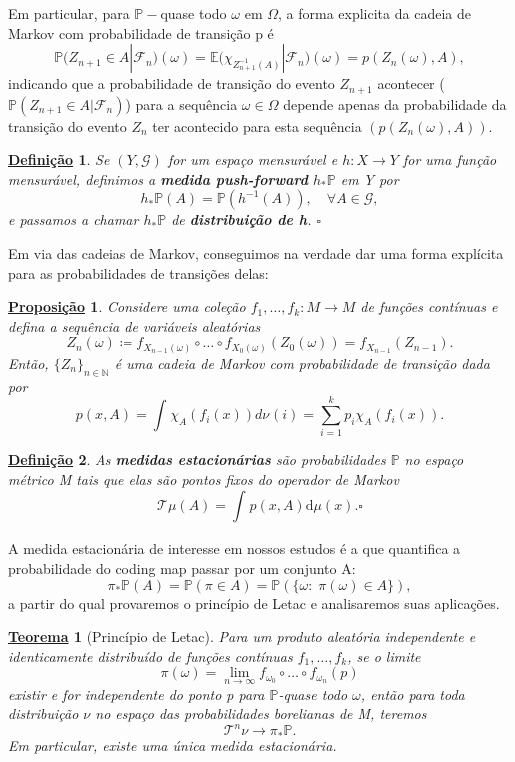 \documentclass[12pt]{article}
\newtheorem*{def*}{\underline{Definição}}
\newtheorem*{theorem*}{\underline{Teorema}}
\newtheorem*{prop*}{\underline{Proposição}}
\theoremstyle{definition}
\begin{document}
Em particular, para \(\mathbb{P}-\)quase todo \(\omega \) em \(\Omega \), a forma explicita da cadeia de Markov com probabilidade de transição p é
\[
	\mathbb{P}(Z_{n+1}\in A| \mathcal{F}_{n})(\omega  )= \mathbb{E}\bigl(\chi_{Z_{n+1}^{-1}(A)}| \mathcal{F}_{n}\bigr)(\omega ) = p(Z_{n}(\omega ), A),
\]
indicando que a probabilidade de transição do evento \(Z_{n+1}\) acontecer (\(\mathbb{P}(Z_{n+1}\in A| \mathcal{F}_{n})\)) para a sequência \(\omega \in \Omega \) depende apenas da probabilidade da transição do evento \(Z_{n}\) ter acontecido para esta sequência \((p(Z_{n}(\omega ), A))\).

\begin{def*}
	Se \((Y, \mathcal{G})\) for um espaço mensurável e \(h:X\rightarrow Y\) for uma função mensurável, definimos a \textbf{medida push-forward} \(h_*\mathbb{P}\) em Y por
	\[
		h_*\mathbb{P}(A) = \mathbb{P}(h^{-1}(A)), \quad \forall A\in \mathcal{G},
	\]
	e passamos a chamar \(h_*\mathbb{P}\) de \textbf{distribuição de h}. \(\square\)
\end{def*}

Em via das cadeias de Markov, conseguimos na verdade dar uma forma explícita para as probabilidades de transições delas:
\begin{prop*}
	Considere uma coleção \(f_1,\dotsc , f_{k}:M\rightarrow M\) de funções contínuas e defina a sequência de variáveis aleatórias
	\[
		Z_{n}(\omega )\coloneqq f_{X_{n-1}(\omega )}\circ \dotsc \circ f_{X_{0}(\omega )}(Z_{0}(\omega )) = f_{X_{n-1}}(Z_{n-1}).
	\]
	Então, \(\{Z_{n}\}_{n\in \mathbb{N}}\) é uma cadeia de Markov com probabilidade de transição dada por
	\[
		p(x, A)=\int_{}\chi_{A}(f_{i}(x)) d\nu_{}(i)=\sum\limits_{i=1}^{k}p_{i}\chi_{A}(f_{i}(x)).
	\]
\end{prop*}

\begin{def*}
	As \textbf{medidas estacionárias} são probabilidades \(\mathbb{P}\) no espaço métrico M tais que elas são pontos fixos do operador de Markov
	\[
		\mathcal{T}\mu (A) = \int_{}^{}p(x, A) \mathrm{d}\mu(x). \square
	\]
\end{def*}
A medida estacionária de interesse em nossos estudos é a que quantifica a probabilidade do coding map passar por um conjunto A:
\[
	\pi_{*}\mathbb{P}(A) = \mathbb{P}(\pi \in A) = \mathbb{P}(\{\omega:\; \pi (\omega )\in A\}),
\]
a partir do qual provaremos o princípio de Letac e analisaremos suas aplicações.
\begin{theorem*}[Princípio de Letac]
	Para um produto aleatória independente e identicamente distribuído de funções contínuas \(f_1, \dotsc , f_{k}\), se o limite
	\[
		\pi (\omega ) = \lim_{n\to \infty}f_{\omega_{0}}\circ \dotsc \circ f_{\omega_{n}}(p)
	\]
	existir e for independente do ponto p para \(\mathbb{P}\)-quase todo \(\omega \), então para toda distribuição \(\nu \) no espaço das probabilidades borelianas de M, teremos
	\[
		\mathcal{T}^{n}\nu \to \pi_{*}\mathbb{P}.
	\]
	Em particular, existe uma única medida estacionária.
\end{theorem*}
\end{document}
